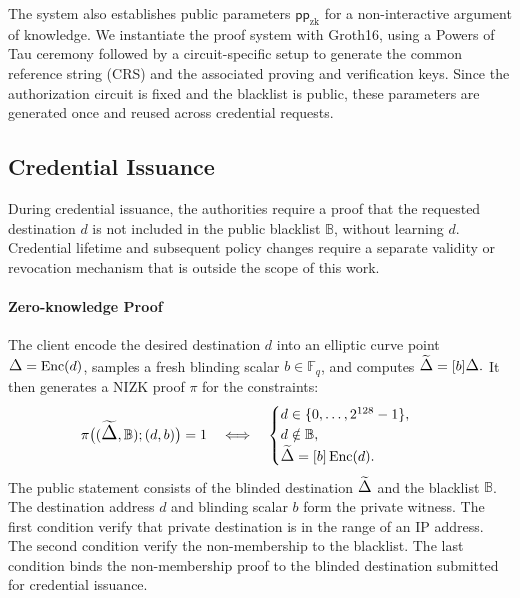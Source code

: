The system also establishes public parameters $\mathsf{pp}_{\mathrm{zk}}$ for a non-interactive argument of knowledge. 
We instantiate the proof system with Groth16, using a Powers of Tau ceremony followed by a circuit-specific setup to generate the common reference string (CRS) and the associated proving and verification keys. 
Since the authorization circuit is fixed and the blacklist is public, these parameters are generated once and reused across credential requests.


\subsection{Credential Issuance} 
\label{sec:scheme-issuance}
During credential issuance, the authorities require a proof that the requested destination $d$ is not included in the public blacklist $\mathbb{B}$, without learning $d$.
Credential lifetime and subsequent policy changes require a separate validity or revocation mechanism that is outside the scope of this work.

\paragraph{Zero-knowledge Proof}
\label{sec:zk-proof}
The client encode the desired destination $d$ into an elliptic curve point $\D{}=\operatorname{Enc}(d)$, 
samples a fresh blinding scalar $b \in \mathbb{F}_q$, and computes $ \widetilde{\D{}}=[b]\D{}. $
It then generates a NIZK proof $\pi$ for the constraints:
\begin{equation}
        \begin{aligned}
        &\pi \bigl((\widetilde{\D{}},\mathbb{B});(d,b)\bigr)=1 \quad\Longleftrightarrow\quad
        \begin{cases}
            d\in\{0,\ldots,2^{128}-1\},\\
            d\notin\mathbb{B},\\
            \widetilde{\D{}}
            =[b]\operatorname{Enc}(d).
        \end{cases}
    \end{aligned}
\end{equation}
The public statement consists of the blinded destination $\widetilde{\D{}}$ and the blacklist $\mathbb{B}$.
The destination address $d$ and blinding scalar $b$ form the private witness.
The first condition verify that private destination is in the range of an IP address.
The second condition verify the non-membership to the blacklist.
The last condition binds the non-membership proof to the blinded destination submitted for credential issuance.

